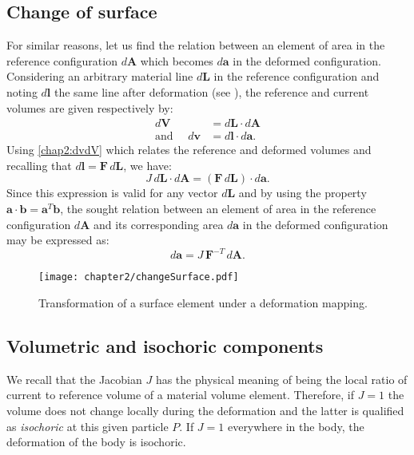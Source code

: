 	\subsection{Change of surface}
For similar reasons, let us find the relation between an element of area in the reference configuration $d\mathbf{A}$ which becomes $d\mathbf{a}$ in the deformed configuration. Considering an arbitrary material line $d\mathbf{L}$ in the reference configuration and noting $d\mathbf{l}$ the same line after deformation (see ), the reference and current volumes are given respectively by:
\begin{align}
d\mathbf{V} &= d\mathbf{L} \cdot d\mathbf{A} \\
\mbox{and } \quad d\mathbf{v} &= d\mathbf{l} \cdot d\mathbf{a}.
\end{align}
Using \eqref{chap2:dvdV} which relates the reference and deformed volumes and recalling that $d\mathbf{l} = \mathbf{F} \, d\mathbf{L}$, we have:
\begin{equation}
J \, d\mathbf{L} \cdot d\mathbf{A} = (\mathbf{F} \, d\mathbf{L}) \cdot d\mathbf{a}.
\end{equation}
\ON Since \OFF this expression is valid for any vector $d\mathbf{L}$ and by using the property $\mathbf{a} \cdot \mathbf{b} = \mathbf{a} ^{T} \mathbf{b}$, \ON the sought relation between an element of area in the reference configuration $d\mathbf{A}$ and its corresponding area $d\mathbf{a}$ in the deformed configuration may be expressed as: \OFF
\begin{equation}
\label{chap2:dadA}
d\mathbf{a} = J \, \mathbf{F}^{-T} \, d\mathbf{A}.
\end{equation}
% 
\begin{figure}[h]
\begin{center}
\texttt{[image: chapter2/changeSurface.pdf]}
\end{center}
\caption{Transformation of a surface element under a deformation mapping. }
\label{chap2:fig-changeSurface}
\end{figure}
			
	\subsection{Volumetric and isochoric components}
We recall that the Jacobian $J$ has the physical meaning of being the local ratio of current to reference volume of a material volume element. Therefore, if $J = 1$ the volume does not change locally during the deformation and the latter is qualified as \emph{isochoric} at this given particle $P$. If $J = 1$ everywhere in the body, the deformation of the body is isochoric. 

